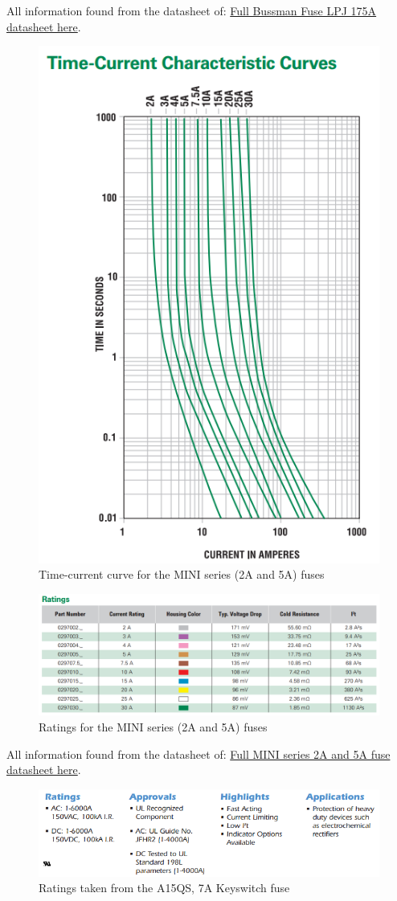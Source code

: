 \documentclass{article}
\begin{document}
{All information found from the datasheet of:
\href{http://www.allfuses.com/media/documents/Bussmann\%20LPJ\%20(70-600A).pdf}{Full Bussman Fuse LPJ 175A datasheet here}.

\begin{figure}[H]
    \centering
    \includegraphics[width = 0.5 \textwidth]{mini_timecurve}
    \caption{Time-current curve for the MINI series (2A and 5A) fuses}
    \label{MINItimecurve}
\end{figure}

\begin{figure}[H]
    \centering
    \includegraphics[width = 0.5 \textwidth]{mini_ratings}
    \caption{Ratings for the MINI series (2A and 5A) fuses}
    \label{MINIratings}
\end{figure}

All information found from the datasheet of:
\href{http://www.littelfuse.com/~/media/automotive/datasheets/fuses/automotive-fuses/littelfuse_automotive_blade_fuse_mini_32v.pdf}{Full MINI series 2A and 5A fuse datasheet here}.

\begin{figure}[H]
    \centering
    \includegraphics[width = 0.6 \textwidth]{Keyswitchratings}
    \caption{Ratings taken from the A15QS, 7A Keyswitch fuse}
    \label{keyswitchratings}
\end{figure}

}
\end{document}
